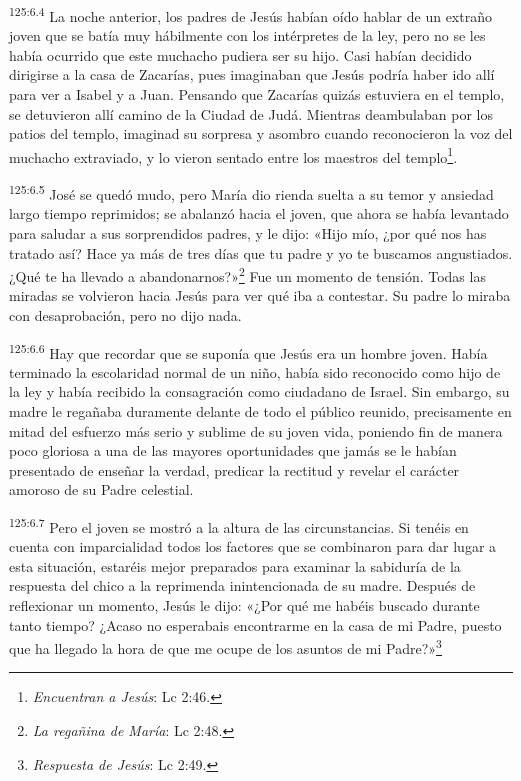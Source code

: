 \par
\textsuperscript{125:6.4} La noche anterior, los padres de Jesús habían oído hablar de un extraño joven que se batía muy hábilmente con los intérpretes de la ley, pero no se les había ocurrido que este muchacho pudiera ser su hijo. Casi habían decidido dirigirse a la casa de Zacarías, pues imaginaban que Jesús podría haber ido allí para ver a Isabel y a Juan. Pensando que Zacarías quizás estuviera en el templo, se detuvieron allí camino de la Ciudad de Judá. Mientras deambulaban por los patios del templo, imaginad su sorpresa y asombro cuando reconocieron la voz del muchacho extraviado, y lo vieron sentado entre los maestros del templo\footnote{\textit{Encuentran a Jesús}: Lc 2:46.}.

\par
\textsuperscript{125:6.5} José se quedó mudo, pero María dio rienda suelta a su temor y ansiedad largo tiempo reprimidos; se abalanzó hacia el joven, que ahora se había levantado para saludar a sus sorprendidos padres, y le dijo: «Hijo mío, ¿por qué nos has tratado así? Hace ya más de tres días que tu padre y yo te buscamos angustiados. ¿Qué te ha llevado a abandonarnos?»\footnote{\textit{La regañina de María}: Lc 2:48.} Fue un momento de tensión. Todas las miradas se volvieron hacia Jesús para ver qué iba a contestar. Su padre lo miraba con desaprobación, pero no dijo nada.

\par
\textsuperscript{125:6.6} Hay que recordar que se suponía que Jesús era un hombre joven. Había terminado la escolaridad normal de un niño, había sido reconocido como hijo de la ley y había recibido la consagración como ciudadano de Israel. Sin embargo, su madre le regañaba duramente delante de todo el público reunido, precisamente en mitad del esfuerzo más serio y sublime de su joven vida, poniendo fin de manera poco gloriosa a una de las mayores oportunidades que jamás se le habían presentado de enseñar la verdad, predicar la rectitud y revelar el carácter amoroso de su Padre celestial.

\par
\textsuperscript{125:6.7} Pero el joven se mostró a la altura de las circunstancias. Si tenéis en cuenta con imparcialidad todos los factores que se combinaron para dar lugar a esta situación, estaréis mejor preparados para examinar la sabiduría de la respuesta del chico a la reprimenda inintencionada de su madre. Después de reflexionar un momento, Jesús le dijo: «¿Por qué me habéis buscado durante tanto tiempo? ¿Acaso no esperabais encontrarme en la casa de mi Padre, puesto que ha llegado la hora de que me ocupe de los asuntos de mi Padre?»\footnote{\textit{Respuesta de Jesús}: Lc 2:49.}

